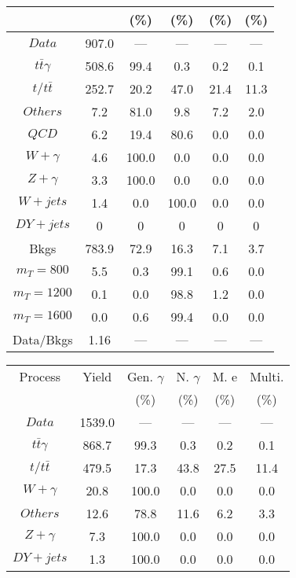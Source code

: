 \begin{figure}
\begin{minipage}[c]{0.32\textwidth}
{\begin{tabular}{cccccc}
 &  & (\%) & (\%) & (\%) & (\%)  \\
\hline
                                                                      $ Data $ &  907.0 &  --- &  --- &  --- &  ---\\
$ t\bar{t}\gamma $ &  508.6 &  99.4 &  0.3 &  0.2 &  0.1\\
$ t/t\bar{t} $ &  252.7 &  20.2 &  47.0 &  21.4 &  11.3\\
$ Others $ &  7.2 &  81.0 &  9.8 &  7.2 &  2.0\\
$ QCD $ &  6.2 &  19.4 &  80.6 &  0.0 &  0.0\\
$ W+\gamma $ &  4.6 &  100.0 &  0.0 &  0.0 &  0.0\\
$ Z+\gamma $ &  3.3 &  100.0 &  0.0 &  0.0 &  0.0\\
$ W+jets $ &  1.4 &  0.0 &  100.0 &  0.0 &  0.0\\
$ DY+jets $ &  0 &  0 &  0 &  0 &  0\\
Bkgs &  783.9 &  72.9 &  16.3 &  7.1 &  3.7\\
$ m_{T} = 800 $ &  5.5 &  0.3 &  99.1 &  0.6 &  0.0\\
$ m_{T} = 1200 $ &  0.1 &  0.0 &  98.8 &  1.2 &  0.0\\
$ m_{T} = 1600 $ &  0.0 &  0.6 &  99.4 &  0.0 &  0.0\\
Data/Bkgs &  1.16 &  --- &  --- &  --- &  ---\\
\hline
\end{tabular}
}
\end{minipage}
\begin{minipage}[c]{0.32\textwidth}
\centering
\tiny{
\begin{tabular}{cccccc}
\hline
Process & Yield & Gen. $\gamma$ & N. $\gamma$ & M. e & Multi. \\
 &  & (\%) & (\%) & (\%) & (\%)  \\
\hline
                                                                      $ Data $ &  1539.0 &  --- &  --- &  --- &  ---\\
$ t\bar{t}\gamma $ &  868.7 &  99.3 &  0.3 &  0.2 &  0.1\\
$ t/t\bar{t} $ &  479.5 &  17.3 &  43.8 &  27.5 &  11.4\\
$ W+\gamma $ &  20.8 &  100.0 &  0.0 &  0.0 &  0.0\\
$ Others $ &  12.6 &  78.8 &  11.6 &  6.2 &  3.3\\
$ Z+\gamma $ &  7.3 &  100.0 &  0.0 &  0.0 &  0.0\\
$ DY+jets $ &  1.3 &  100.0 &  0.0 &  0.0 &  0.0\\

\end{tabular}}
\end{minipage}
\end{figure}

